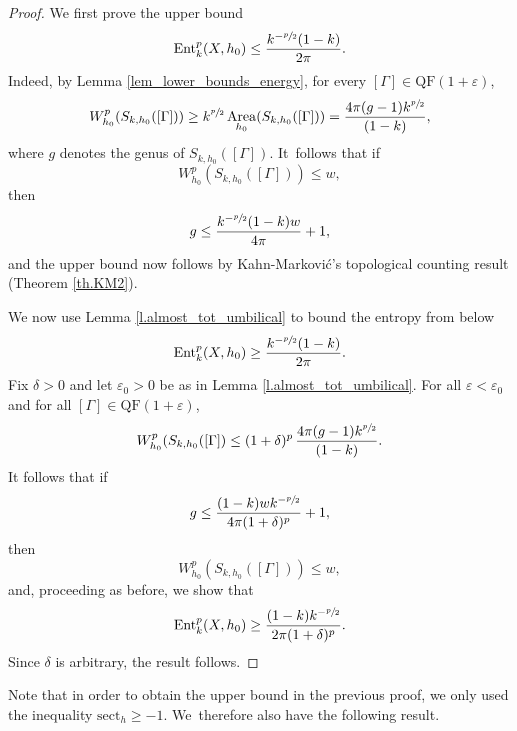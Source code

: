 \documentclass[11pt]{article}
\theoremstyle{plain}
\theoremstyle{definition}
\let\eps\varepsilon
\newcommand{\sect}{\mathrm{sect}}
\newcommand{\Ent}{\mathrm{Ent}}
\newcommand{\QF}{\mathrm{QF}}
\DeclareMathOperator{\Area}{Area}
\begin{document}
\begin{proof}
We first prove the upper bound
\begin{equation*}
\Ent^p_{k}(X,h_0)\leq\frac{k^{-\sfrac{p}{2}}(1-k)}{2\pi}.
\end{equation*}
Indeed, by Lemma \ref{lem_lower_bounds_energy}, for every $[\Gamma]\in\QF(1+\eps)$,
\begin{equation*}
W_{h_0}^{p}(S_{k,h_0}([\Gamma]))\geq k^{\sfrac{p}{2}}\Area_{h_0}(S_{k,h_0}([\Gamma]))=\frac{4\pi(g-1)k^{\sfrac{p}{2}}}{(1-k)},
\end{equation*}
where $g$ denotes the genus of $S_{k,h_0}([\Gamma])$. It~follows that if
\begin{equation*}
W_{h_0}^{p}(S_{k,h_0}([\Gamma])) \leq w,
\end{equation*}
then
\begin{equation*}
g \leq \frac{k^{-\sfrac{p}{2}}(1-k)w}{4\pi} + 1,
\end{equation*}
and the upper bound now follows by Kahn-Markovi\'c's topological counting result (Theorem \ref{th.KM2}).

We now use Lemma \ref{l.almost_tot_umbilical} to bound the entropy from below
\begin{equation*}
\Ent^p_{k}(X,h_0)\geq\frac{k^{-\sfrac{p}{2}}(1-k)}{2\pi}.
\end{equation*}
Fix $\delta>0$ and let $\eps_0>0$ be as in Lemma \ref{l.almost_tot_umbilical}. For all $\eps<\eps_0$ and for all $[\Gamma]\in\QF(1+\eps)$,
\begin{equation*}
W^{p}_{h_0}(S_{k,h_0}([\Gamma])\leq (1+\delta)^p\,\frac{4\pi(g-1)k^{\sfrac{p}{2}}}{(1-k)}.
\end{equation*}
It follows that if
\begin{equation*}
g \leq \frac{(1-k)w k^{-\sfrac{p}{2}}}{4\pi(1+\delta)^p} + 1,
\end{equation*}
then
\begin{equation*}
W_{h_0}^{p}(S_{k,h_0}([\Gamma])) \leq w,
\end{equation*}
and, proceeding as before, we show that
\begin{equation*}
\Ent^{p}_{k}(X,h_0)\geq\frac{(1-k)k^{-\sfrac{p}{2}}}{2\pi(1+\delta)^p}.
\end{equation*}
Since $\delta$ is arbitrary, the result follows.
\end{proof}

Note that in order to obtain the upper bound in the previous proof, we only used the inequality $\sect_h\geq -1$. We~therefore also have the following result.
\end{document}
